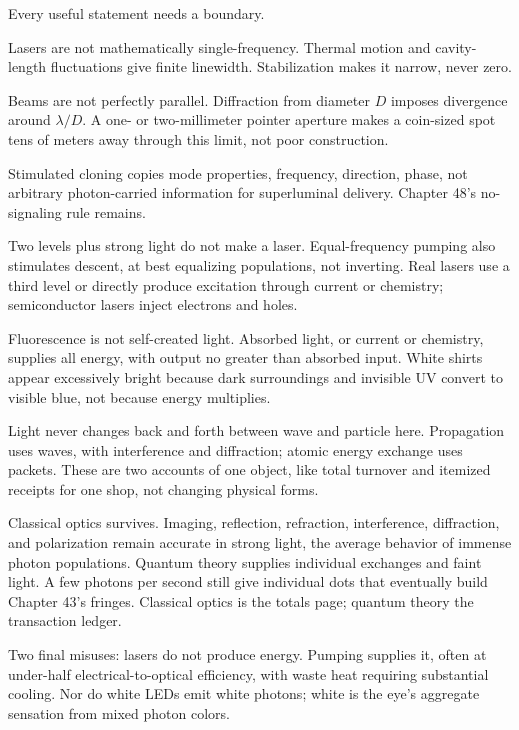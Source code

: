 \begin{mainline}
Every useful statement needs a boundary.

Lasers are not mathematically single-frequency. Thermal motion and cavity-length fluctuations give finite linewidth. Stabilization makes it narrow, never zero.

Beams are not perfectly parallel. Diffraction from diameter \(D\) imposes divergence around \(\lambda/D\). A one- or two-millimeter pointer aperture makes a coin-sized spot tens of meters away through this limit, not poor construction.

Stimulated cloning copies mode properties, frequency, direction, phase, not arbitrary photon-carried information for superluminal delivery. Chapter 48's no-signaling rule remains.

Two levels plus strong light do not make a laser. Equal-frequency pumping also stimulates descent, at best equalizing populations, not inverting. Real lasers use a third level or directly produce excitation through current or chemistry; semiconductor lasers inject electrons and holes.

Fluorescence is not self-created light. Absorbed light, or current or chemistry, supplies all energy, with output no greater than absorbed input. White shirts appear excessively bright because dark surroundings and invisible UV convert to visible blue, not because energy multiplies.

Light never changes back and forth between wave and particle here. Propagation uses waves, with interference and diffraction; atomic energy exchange uses packets. These are two accounts of one object, like total turnover and itemized receipts for one shop, not changing physical forms.

Classical optics survives. Imaging, reflection, refraction, interference, diffraction, and polarization remain accurate in strong light, the average behavior of immense photon populations. Quantum theory supplies individual exchanges and faint light. A few photons per second still give individual dots that eventually build Chapter 43's fringes. Classical optics is the totals page; quantum theory the transaction ledger.

Two final misuses: lasers do not produce energy. Pumping supplies it, often at under-half electrical-to-optical efficiency, with waste heat requiring substantial cooling. Nor do white LEDs emit white photons; white is the eye's aggregate sensation from mixed photon colors.
\end{mainline}

